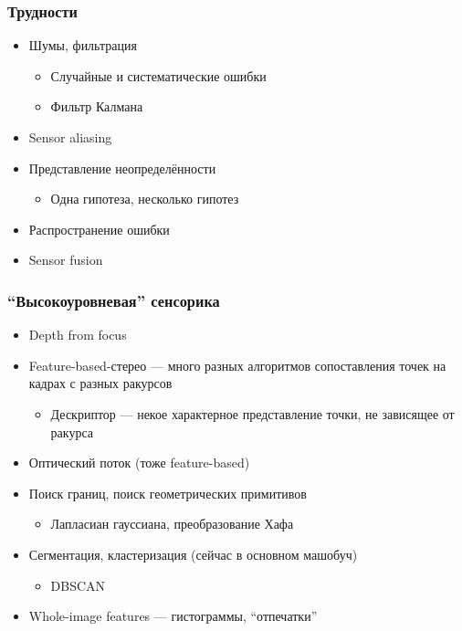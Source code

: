 \documentclass{../../slides-style}
\begin{document}
    \begin{frame}
        \frametitle{Трудности}
        \begin{itemize}
            \item Шумы, фильтрация
            \begin{itemize}
                \item Случайные и систематические ошибки
                \item Фильтр Калмана
            \end{itemize}
            \item Sensor aliasing
            \item Представление неопределённости
            \begin{itemize}
                \item Одна гипотеза, несколько гипотез
            \end{itemize}
            \item Распространение ошибки
            \item Sensor fusion
        \end{itemize}
    \end{frame}

    \begin{frame}
        \frametitle{\enquote{Высокоуровневая} сенсорика}
        \begin{itemize}
            \item Depth from focus
            \item Feature-based-стерео --- много разных алгоритмов сопоставления точек на кадрах с разных ракурсов
            \begin{itemize}
                \item Дескриптор --- некое характерное представление точки, не зависящее от ракурса
            \end{itemize}
            \item Оптический поток (тоже feature-based)
            \item Поиск границ, поиск геометрических примитивов
            \begin{itemize}
                \item Лапласиан гауссиана, преобразование Хафа
            \end{itemize}
            \item Сегментация, кластеризация (сейчас в основном машобуч)
            \begin{itemize}
                \item DBSCAN
            \end{itemize}
            \item Whole-image features --- гистограммы, \enquote{отпечатки}
        \end{itemize}
    \end{frame}
\end{document}
